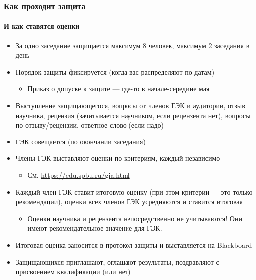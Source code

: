 \documentclass{../../slides-style}
\begin{document}
    \begin{frame}
        \frametitle{Как проходит защита}
        \framesubtitle{И как ставятся оценки}
        \begin{footnotesize}
            \begin{itemize}
                \item За одно заседание защищается максимум 8 человек, максимум 2 заседания в день
                \item Порядок защиты фиксируется (когда вас распределяют по датам)
                \begin{itemize}
                    \item \footnotesize{Приказ о допуске к защите --- где-то в начале-середине мая}
                \end{itemize}
                \item Выступление защищающегося, вопросы от членов ГЭК и аудитории, отзыв научника, рецензия (зачитывается научником, если рецензента нет), вопросы по отзыву/рецензии, ответное слово (если надо)
                \item ГЭК совещается (по окончании заседания)
                \item Члены ГЭК выставляют оценки по критериям, каждый независимо
                \begin{itemize}
                    \item \footnotesize{См. \url{https://edu.spbu.ru/gia.html}}
                \end{itemize}
                \item Каждый член ГЭК ставит итоговую оценку (при этом критерии --- это только рекомендации), оценки всех членов ГЭК усредняются и ставится итоговая
                \begin{itemize}
                    \item \footnotesize{Оценки научника и рецензента непосредственно не учитываются! Они имеют рекомендательное значение для ГЭК.}
                \end{itemize}
                \item Итоговая оценка заносится в протокол защиты и выставляется на Blackboard
                \item Защищающихся приглашают, оглашают результаты, поздравляют с присвоением квалификации (или нет)
            \end{itemize}
        \end{footnotesize}
    \end{frame}
\end{document}
